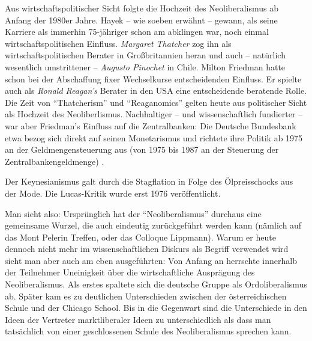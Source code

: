 Aus wirtschaftspolitischer Sicht folgte die Hochzeit des Neoliberalismus ab Anfang der 1980er Jahre. Hayek -- wie soeben erwähnt -- gewann, als seine Karriere als immerhin 75-jähriger schon am abklingen war, noch einmal wirtschaftspolitischen Einfluss. \textit{Margaret Thatcher} zog ihn als wirtschaftspolitischen Berater in Großbritannien heran und auch -- natürlich wesentlich umstrittener -- \textit{Augusto Pinochet} in Chile. Milton Friedman hatte schon bei der Abschaffung fixer Wechselkurse entscheidenden Einfluss. Er spielte auch als \textit{Ronald Reagan's} Berater   in den USA eine entscheidende beratende Rolle. Die Zeit von "`Thatcherism"' und "`Reaganomics"'  gelten heute aus politischer Sicht als Hochzeit des Neoliberlismus. Nachhaltiger -- und wissenschaftlich fundierter -- war aber Friedman's Einfluss auf die Zentralbanken:  Die Deutsche Bundesbank etwa bezog sich direkt auf seinen Monetarismus und richtete ihre Politik ab 1975 an der Geldmengensteuerung aus (von 1975 bis 1987 an der Steuerung der Zentralbankengeldmenge) \parencite[S. 36]{BBK2016}. 




Der Keynesianismus galt durch die Stagflation in Folge des Ölpreisschocks aus der Mode. Die Lucas-Kritik wurde erst 1976 veröffentlicht.



Man sieht also: Ursprünglich hat der "`Neoliberalismus"' durchaus eine gemeinsame Wurzel, die auch eindeutig zurückgeführt werden kann (nämlich auf das Mont Pelerin Treffen, oder das Colloque Lippmann). Warum er heute dennoch nicht mehr im wissenschaftlichen Diskurs als Begriff verwendet wird sieht man aber auch am eben ausgeführten: Von Anfang an herrschte innerhalb der Teilnehmer Uneinigkeit über die wirtschaftliche Ausprägung des Neoliberalismus. Als erstes spaltete sich die deutsche Gruppe als Ordoliberalismus ab. Später kam es zu deutlichen Unterschieden zwischen der österreichischen Schule und der Chicago School. Bis in die Gegenwart sind die Unterschiede in den Ideen der Vertreter marktliberaler Ideen zu unterschiedlich als dass man tatsächlich von einer geschlossenen Schule des Neoliberalismus sprechen kann.



